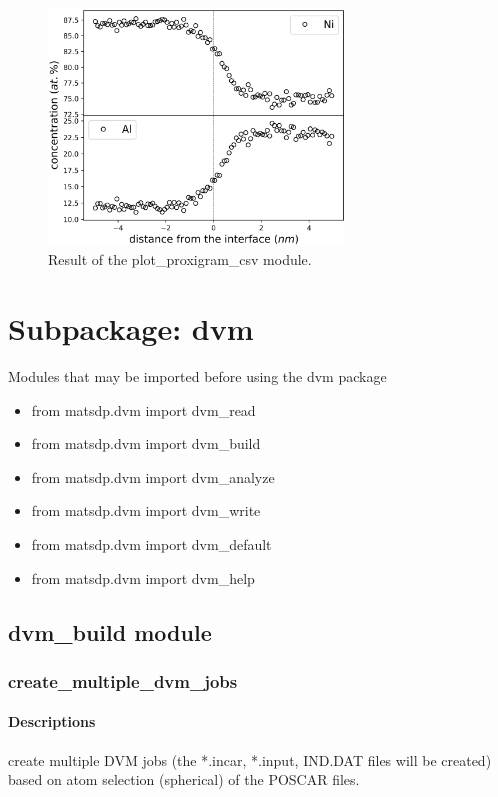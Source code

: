 \documentclass[12pt]{book}
\begin{document}
\begin{figure}[htbp]
\centering
\includegraphics[width=0.7\textwidth]{outputs_apt_concentration.pdf}
\caption{Result of the plot\_proxigram\_csv module.}
\label{fig:outputs_apt_concentration}
\end{figure}


\chapter{Subpackage: dvm}

Modules that may be imported before using the dvm package
\begin{itemize}
\item from matsdp.dvm import dvm\_read
\item from matsdp.dvm import dvm\_build
\item from matsdp.dvm import dvm\_analyze
\item from matsdp.dvm import dvm\_write
\item from matsdp.dvm import dvm\_default
\item from matsdp.dvm import dvm\_help
\end{itemize}

\section{dvm\_build module}
\subsection{create\_multiple\_dvm\_jobs}
\subsubsection{Descriptions}
create multiple DVM jobs (the *.incar, *.input, IND.DAT files will be created) based on atom selection (spherical) of the POSCAR files.
 
\end{document}
